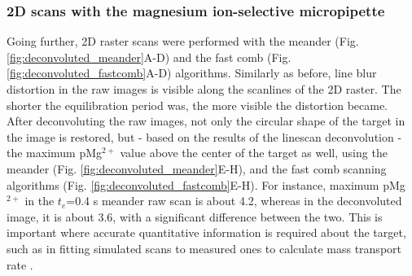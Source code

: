 			\subsubsection{2D scans with the magnesium ion-selective micropipette}

Going further, 2D raster scans were performed with the meander (Fig. \ref{fig:deconvoluted_meander}A-D) and the fast comb (Fig. \ref{fig:deconvoluted_fastcomb}A-D) algorithms.
Similarly as before, line blur distortion in the raw images is visible along the scanlines of the 2D raster.
The shorter the equilibration period was, the more visible the distortion became.
After deconvoluting the raw images, not only the circular shape of the target in the image is restored, but - based on the results of the linescan deconvolution - the maximum pMg$^{2+}$ value above the center of the target as well, using the meander (Fig. \ref{fig:deconvoluted_meander}E-H), and the fast comb scanning algorithms (Fig. \ref{fig:deconvoluted_fastcomb}E-H).
For instance, maximum pMg$^{2+}$ in the $t_e$=0.4 s meander raw scan is about 4.2, whereas in the deconvoluted image, it is about 3.6, with a significant difference between the two.
This is important where accurate quantitative information is required about the target, such as in fitting simulated scans to measured ones to calculate mass transport rate \cite{gyurcsanyi2004chemical}.\def\s{0.25}

